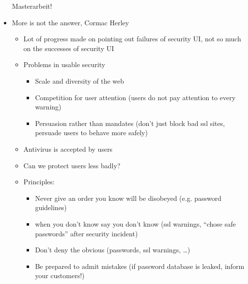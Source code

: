 \documentclass[a4paper,12pt]{scrartcl}
\begin{document}
\begin{itemize}
		Masterarbeit!
	\item
		More is not the answer, Cormac Herley
		\begin{itemize}
			\item
				Lot of progress made on pointing out failures of security UI, not so much on the successes of security UI
			\item
				Problems in usable security
				\begin{itemize}
					\item
						Scale and diversity of the web
					\item
						Competition for user attention (users do not pay attention to every warning)
					\item
						Persuasion rather than mandates (don't just block bad ssl sites, persuade users to behave more safely)
				\end{itemize}
			\item
				Antivirus is accepted by users
			\item
				Can we protect users less badly?
			\item
				Principles:
				\begin{itemize}
					\item
						Never give an order you know will be disobeyed (e.g. password guidelines)
					\item
						when you don't know say you don't know (ssl warnings, \enquote{chose safe passwords} after security incident)
					\item
						Don't deny the obvious (passwords, ssl warnings, \dots)
					\item
						Be prepared to admit mistakes (if password database is leaked, inform your customers!)
				\end{itemize}
		\end{itemize}

		
\end{itemize}
\end{document}
